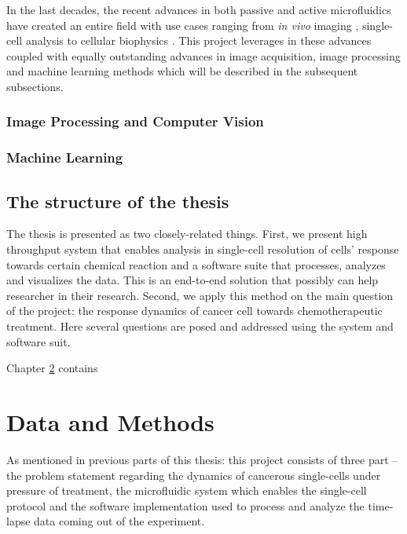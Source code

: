 \documentclass[pdftex,12pt,a4paper]{report}
\begin{document}
In the last decades, the recent advances in both passive and active microfluidics have created an entire field \cite{whitesides2006origins} with use cases ranging from \textit{in vivo} imaging \cite{chronis2007microfluidics}, single-cell analysis \cite{wheeler2003microfluidic} to cellular biophysics \cite{di2010bacterial}. This project leverages in these advances coupled with equally outstanding advances in image acquisition, image processing and machine learning methods which will be described in the subsequent subsections.

\subsection{Image Processing and Computer Vision}


\subsection{Machine Learning}


\section{The structure of the thesis}


The thesis is presented as two closely-related things. First, we present high throughput system that enables analysis in single-cell resolution of cells' response towards certain chemical reaction and a software suite that processes, analyzes and visualizes the data. This is an end-to-end solution that possibly can help researcher in their research. Second, we apply this method on the main question of the project: the response dynamics of cancer cell towards chemotherapeutic treatment. Here several questions are posed and addressed using the system and software suit.



Chapter \ref{chapter:data_and_method} contains %

\chapter{Data and Methods}

\label{chapter:data_and_method}

As mentioned in previous parts of this thesis: this project consists of three part -- the problem statement regarding the dynamics of cancerous single-cells under pressure of treatment, the microfluidic system which enables the single-cell protocol and the software implementation used to process and analyze the time-lapse data coming out of the experiment. 
\end{document}
